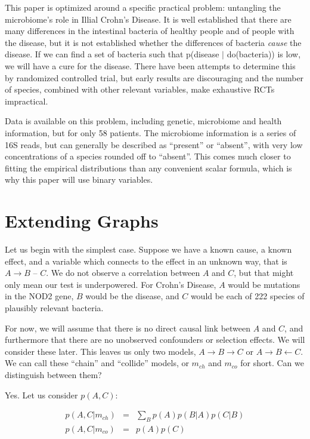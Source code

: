 \documentclass[twocolumn,12pt]{article}
\begin{document}
This paper is optimized around a specific practical problem:
untangling the microbiome's role in Illial Crohn's Disease.  It is
well established that there are many differences in the intestinal
bacteria of healthy people and of people with the disease\cite{hofer}, but it is
not established whether the differences of bacteria \textit{cause} the
disease.  If we can find a set of bacteria such that
p(disease $|$ do(bacteria)) is low, we will have a cure for the disease.
There have been attempts to determine this by randomized controlled
trial, but early results are discouraging\cite{rctma} and the number
of species, combined with other relevant
variables, make exhaustive RCTs impractical.

Data is available on this problem\cite{data}, including genetic, microbiome and
health information, but for only 58 patients.  The microbiome
information is a series of 16S reads, but can generally be described
as ``present'' or ``absent'', with very low concentrations of a
species rounded off to ``absent''.  This comes much closer to fitting
the empirical distributions than any convenient scalar formula, which
is why this paper will use binary variables.

\section{Extending Graphs}

Let us begin with the simplest case.  Suppose we have a known cause, a
known effect, and a variable which connects to the effect in an
unknown way, that is $A \rightarrow B$ -- $C$.  We do not observe a
correlation between $A$ and $C$, but that might only mean our test is
underpowered.  For Crohn's Disease, $A$ would be mutations in the NOD2
gene\cite{nod2}, $B$ would be the disease, and $C$ would be each of 222
species of plausibly relevant bacteria.

For now, we will assume that there is no direct causal
link between $A$ and $C$, and furthermore that there are no unobserved
confounders or selection effects.  We will consider these later.
This leaves us only two models, $A \rightarrow B \rightarrow C$ or $A
\rightarrow B \leftarrow C$.  We can call these ``chain'' and
``collide'' models, or $m_{ch}$ and $m_{co}$ for short.  Can we
distinguish between them?

Yes.  Let us consider
$p(A,C)$:

\begin{eqnarray*}
p(A,C|m_{ch}) & = & \sum_B p(A)p(B|A)p(C|B) \\
p(A,C|m_{co}) & = & p(A)p(C)
\end{eqnarray*}
\end{document}
